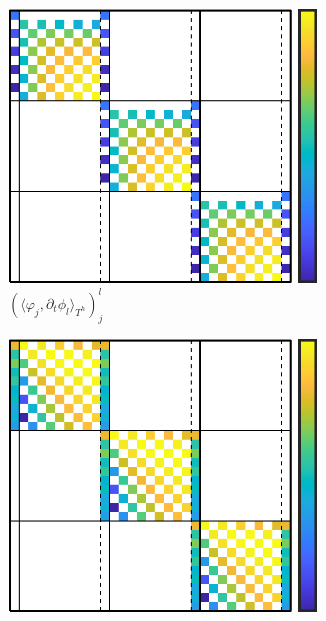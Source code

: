 \begin{example}
        \begin{figure}[!ht]
            \centering
            \begin{subfigure}{0.5\textwidth}
                \centering
                \includegraphics[width = 0.9\textwidth]{9 - finite elements in time/images/matrix 1.png}
                \caption{$(\langle\varphi_{j}, \partial_{t}\phi_{l}\rangle_{T^{h}})_{j}^{l}$}
            \end{subfigure}%
            \begin{subfigure}{0.5\textwidth}
                \centering
                \includegraphics[width = 0.9\textwidth]{9 - finite elements in time/images/matrix 2.png}

\end{subfigure}
\end{figure}
\end{example}
